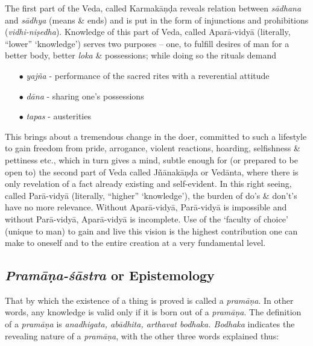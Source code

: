 The first part of the Veda, called Karmakāṇḍa reveals relation between  {\sl sādhana} and {\sl sādhya} (means \& ends) and is put in the form of injunctions and prohibitions ({\sl vidhi-niṣedha}). Knowledge of this part of Veda, called Aparā-vidyā (literally, ``lower'' `knowledge') serves two purposes -- one, to fulﬁll desires of man for a better body, better {\sl loka} \& possessions; while doing so the rituals demand 
\begin{itemize}
\item[$\bullet$] {\sl yajña} - performance of the sacred rites with a reverential attitude 

\item[$\bullet$] {\sl dāna} - sharing one's possessions

\item[$\bullet$] {\sl tapas} - austerities 
\end{itemize}

This brings about a tremendous change in the doer, committed to such a lifestyle to gain freedom from pride, arrogance, violent reactions, hoarding, selﬁshness \& pettiness etc., which in turn gives a mind, subtle enough for (or prepared to be open to) the second part of Veda called Jñānakāṇḍa or Vedānta, where there is only revelation of a fact already existing and self-evident. In this right seeing, called Parā-vidyā  (literally, ``higher'' `knowledge'), the burden of do’s \& don't's have no more relevance. Without Aparā-vidyā, Parā-vidyā is impossible and without Parā-vidyā, Aparā-vidyā is incomplete. Use of the `faculty of choice' (unique to man) to gain and live this vision is the highest contribution one can make to oneself and to the entire creation at a very fundamental level.

\subsection{{{\sl\bfseries Pramāṇa-śāstra}\relax} or Epistemology}\label{art12-sec2.2}

That by which the existence of a thing is proved is called a {\sl pramāṇa}. In other words, any knowledge is valid only if it is born out of a {\sl pramāṇa}. The deﬁnition of a {\sl pramāṇa}  is {\sl anadhigata, abādhita, arthavat bodhaka. Bodhaka} indicates the revealing nature of a {\sl pramāṇa}, with the other three words explained thus:

